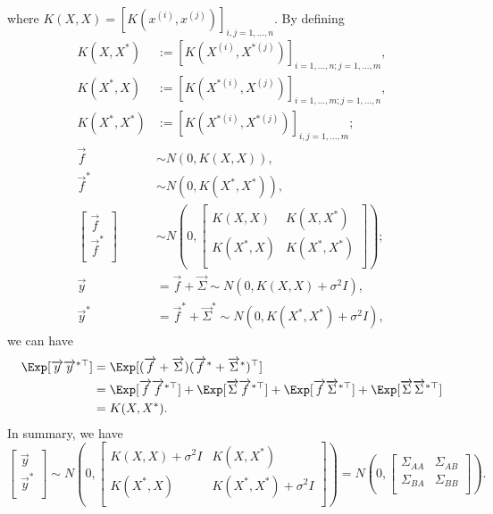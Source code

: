 where $K(X, X) = [K(x^{(i)}, x^{(j)})]_{i, j = 1, ..., n}$.  By defining 
\begin{equation*} \label{eq1}
	\begin{split}
		K(X, X^*) &:= [K(X^{(i)}, X^{*(j)})]_{i = 1, ..., n; j = 1, ..., m},\\
		K(X^*, X) &:= [K(X^{*(i)}, X^{(j)})]_{i = 1, ..., m; j = 1, ..., n},\\
		K(X^*, X^*) &:= [K(X^{*(i)}, X^{*(j)})]_{i, j = 1, ..., m};\\
		\overrightarrow{f} &\sim N(0, K(X, X)),\\
		\overrightarrow{f}^* &\sim N(0, K(X^*, X^*)),\\
		\begin{bmatrix}
			\overrightarrow{f}\\
			\overrightarrow{f}^*\\
		\end{bmatrix}
		&\sim N(0, 
		\begin{bmatrix}
			K(X, X) & K(X, X^*)\\
			K(X^*, X) & K(X^*, X^*) \\
		\end{bmatrix}
		);\\
		\overrightarrow{y} &= \overrightarrow{f} + \overrightarrow{\Sigma} \sim N(0, K(X, X) + \sigma^2 I),\\
		\overrightarrow{y}^* &= \overrightarrow{f}^* + \overrightarrow{\Sigma}^* \sim N(0, K(X^*, X^*) + \sigma^2 I),
	\end{split}
\end{equation*}
we can have
\begin{equation*} \label{eq1}
	\begin{split}
		\Exp[\overrightarrow{y}\overrightarrow{y}^{*\top}] & = \Exp[(\overrightarrow{f} + \overrightarrow{\Sigma})(\overrightarrow{f}^* + \overrightarrow{\Sigma}^*)^\top]\\
		& = \Exp[\overrightarrow{f} \overrightarrow{f}^{*\top}] + \Exp[\overrightarrow{\Sigma} \overrightarrow{f}^{*\top}] + \Exp[\overrightarrow{f}\overrightarrow{\Sigma}^{*\top}] + \Exp[\overrightarrow{\Sigma}\overrightarrow{\Sigma}^{*\top}]\\
		& = K(X, X^*).
	\end{split}
\end{equation*}
In summary, we have
\begin{equation*}
	\begin{bmatrix}
		\overrightarrow{y}\\
		\overrightarrow{y}^*\\
	\end{bmatrix}
	\sim N(0, 
	\begin{bmatrix}
		K(X, X) + \sigma^2 I & K(X, X^*)\\
		K(X^*, X) & K(X^*, X^*) + \sigma^2 I\\
	\end{bmatrix}
	) = N(0, 
	\begin{bmatrix}
		\Sigma_{AA} & \Sigma_{AB}\\
		\Sigma_{BA} & \Sigma_{BB}\\
	\end{bmatrix}
	).
\end{equation*}
